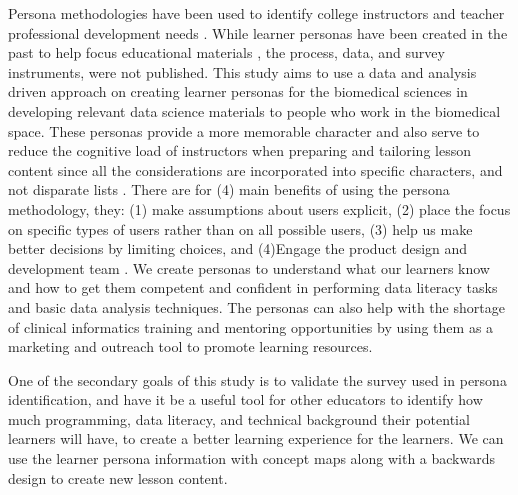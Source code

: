 \documentclass[020-persona\_validation.tex]{subfiles}
\begin{document}
    Persona methodologies have been used to identify
    college instructors and teacher professional development needs
    \cite{zagallo2019through}.
    While learner personas have been created in the past to help focus educational materials
    \cite{RStudio2019, softwarecarpentryLearnerProfiles},
    the process, data, and survey instruments, were not published.
    This study aims to use a data and analysis driven approach on creating learner personas for the biomedical sciences
    in developing relevant data science materials to people who
    work in the biomedical space.
    These personas provide a more memorable character and also serve to reduce the cognitive load of instructors
    when preparing and tailoring lesson content since all the considerations are incorporated into specific characters,
    and not disparate lists
    \cite{pruittPersonaLifecycleKeeping2006, schwartzParadoxChoiceWhy2016, cooperInmatesAreRunning1999}.
    There are for (4) main benefits of using the persona methodology, they:
    (1) make assumptions about users explicit,
    (2) place the focus on specific types of users rather than on all possible users,
    (3) help us make better decisions by limiting choices, and
    (4)Engage the product design and development team
    \cite{pruittPersonaLifecycleKeeping2006, schwartzParadoxChoiceWhy2016}.
    We create personas to understand what our learners know and how to get them competent and confident
    in performing data literacy tasks and basic data analysis techniques.
    The personas can also help with the shortage of clinical informatics training and mentoring opportunities
    by using them as a marketing and outreach tool to promote learning resources.


    One of the secondary goals of this study is to validate the survey used in persona identification,
    and have it be a useful tool for other educators to identify how much
    programming, data literacy, and technical background their potential learners will have,
    to create a better learning experience for the learners.
    We can use the learner persona information with concept maps along with a backwards design
    to create new lesson content.
\end{document}
